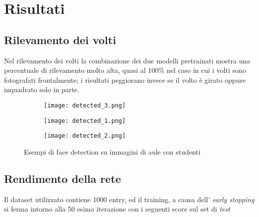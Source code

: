 \chapter{Risultati}

\section{Rilevamento dei volti}
\label{section:results_fd}

Nel rilevamento dei volti la combinazione dei due modelli pretrainati mostra
una percentuale di rilevamento molto alta, quasi al 100\% nel caso in cui i volti sono 
fotografati frontalmente; i risultati peggiorano invece se il volto è girato oppure 
inquadrato solo in parte. 

\smallskip

\begin{figure}[h]
    \centering
    \begin{subfigure}[b]{0.7\linewidth}
      \texttt{[image: detected\_3.png]}
    \end{subfigure}

    \smallskip
    
    \begin{subfigure}[b]{0.7\linewidth}
        \texttt{[image: detected\_1.png]}
    \end{subfigure}

    \smallskip
    
    \begin{subfigure}[b]{0.7\linewidth}
        \texttt{[image: detected\_2.png]}
    \end{subfigure}
    \caption{Esempi di face detection su immagini di aule con studenti}
    \label{fig:example_opencv}
\end{figure}

\section{Rendimento della rete}
\label{section:results_ml}

Il dataset utilizzato contiene 1000 entry, ed il training, a causa dell'
\textit{early stopping} si ferma intorno alla 50 esima iterazione con i seguenti 
score sul set di \textit{test}

\smallskip

